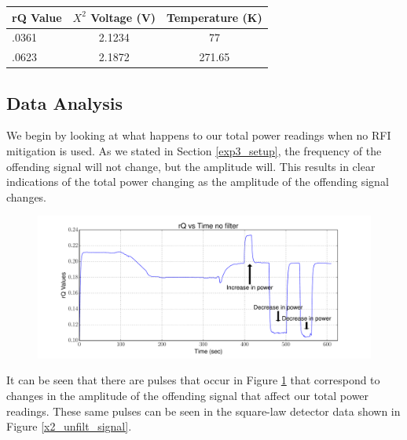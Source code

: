 {\begin{table}[h!tb] \centering
{}
\label{exp3_datapoints}
\begin{tabular}{lcc} \hline
\textbf{rQ Value} & \textbf{$X^2$ Voltage (V)} & \textbf{Temperature (K)} \\ \hline
.0361 & 2.1234 & 77 \\
.0623 & 2.1872 & 271.65 \\ \hline
\end{tabular}
\end{table}

\subsection{Data Analysis}

We begin by looking at what happens to our total power readings when no RFI mitigation is used.  As we stated in Section \ref{exp3_setup}, the frequency of the offending signal will not change, but the amplitude will.  This results in clear indications of the total power changing as the amplitude of the offending signal changes.  

\begin{figure}[h!tb] \centering
\includegraphics[width=\textwidth]{Experiments/Exp4/sdr_raw_unfiltered.pdf}
\label{sdr_unfilt_raw}
\end{figure}

It can be seen that there are pulses that occur in Figure \ref{sdr_unfilt_raw} that correspond to changes in the amplitude of the offending signal that affect our total power readings.  These same pulses can be seen in the square-law detector data shown in Figure \ref{x2_unfilt_signal}.

}
